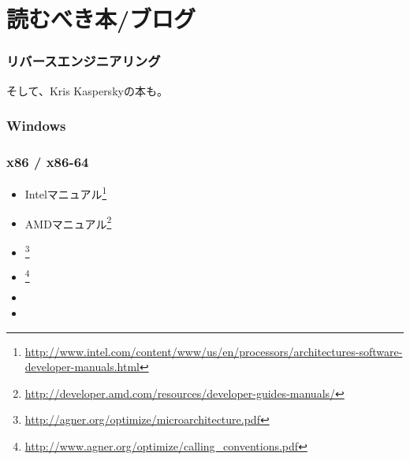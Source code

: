 \chapter{読むべき本/ブログ}


\subsection{リバースエンジニアリング}




そして、Kris Kasperskyの本も。

\subsection{Windows}



\subsection{\CCpp}



\subsection{x86 / x86-64}

\label{x86_manuals}
\begin{itemize}
\item Intelマニュアル\footnote{\AlsoAvailableAs \url{http://www.intel.com/content/www/us/en/processors/architectures-software-developer-manuals.html}}

\item AMDマニュアル\footnote{\AlsoAvailableAs \url{http://developer.amd.com/resources/developer-guides-manuals/}}

\item \AgnerFog{}\footnote{\AlsoAvailableAs \url{http://agner.org/optimize/microarchitecture.pdf}}

\item \AgnerFogCC{}\footnote{\AlsoAvailableAs \url{http://www.agner.org/optimize/calling_conventions.pdf}}

\item \IntelOptimization

\item \AMDOptimization
\end{itemize}

